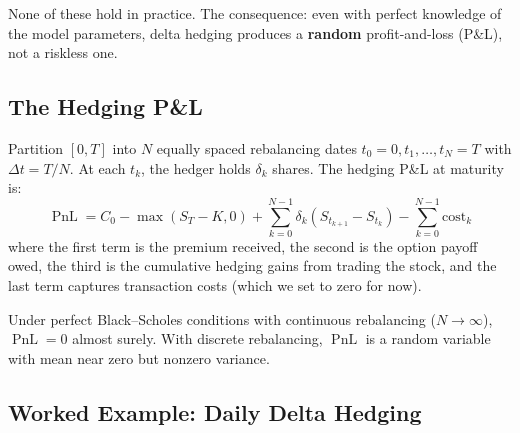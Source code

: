 \documentclass[11pt, a4paper]{article}
\theoremstyle{definition}
\theoremstyle{plain}
\theoremstyle{remark}
\newcommand{\PnL}{\operatorname{PnL}}
\begin{document}
None of these hold in practice. The consequence: even with perfect knowledge of the
model parameters, delta hedging produces a \textbf{random} profit-and-loss (P\&L),
not a riskless one.

\subsection{The Hedging P\&L}

Partition $[0, T]$ into $N$ equally spaced rebalancing dates $t_0 = 0, t_1, \ldots, t_N = T$
with $\Delta t = T/N$.
At each $t_k$, the hedger holds $\delta_k$ shares.
The hedging P\&L at maturity is:
\[
    \PnL = C_0 - \max(S_T - K, 0) + \sum_{k=0}^{N-1} \delta_k (S_{t_{k+1}} - S_{t_k})
    - \sum_{k=0}^{N-1} \text{cost}_k
\]
where the first term is the premium received, the second is the option payoff owed,
the third is the cumulative hedging gains from trading the stock,
and the last term captures transaction costs (which we set to zero for now).

Under perfect Black--Scholes conditions with continuous rebalancing ($N \to \infty$),
$\PnL = 0$ almost surely.
With discrete rebalancing, $\PnL$ is a random variable with mean near zero
but nonzero variance.

\subsection{Worked Example: Daily Delta Hedging}
\end{document}

